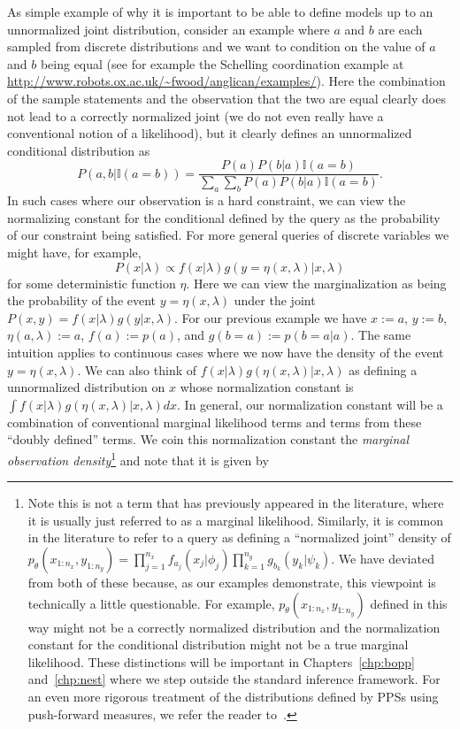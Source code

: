 As simple example of why it is important to be able to define models up to an unnormalized joint
distribution, consider an example where $a$ and $b$ are each sampled from discrete distributions
and we want to condition on the value of $a$ and $b$ being equal (see for example the Schelling
coordination example at {\small \url{http://www.robots.ox.ac.uk/~fwood/anglican/examples/}}).  Here
the combination of the sample statements and the observation that the two are equal clearly
does not lead to a correctly normalized joint (we do not even really have a conventional notion
of a likelihood), but it clearly defines an unnormalized conditional distribution as
\[
P(a,b | \mathbb{I}(a=b)) = \frac{P(a)P(b|a)\mathbb{I}(a=b)}{\sum_a \sum_b P(a)P(b|a) \mathbb{I}(a=b)}.
\]
In such cases where our observation is a hard constraint, we can view the normalizing constant for
the conditional defined by the query as the probability of our constraint being satisfied.  
For more general queries of discrete variables we might have, for example,
\[
P(x|\lambda) \propto f(x|\lambda)g(y=\eta(x,\lambda)|x,\lambda)
\]
for some deterministic function $\eta$.  Here we
can view the marginalization as being the probability of the event $y=\eta(x,\lambda)$ under the joint $P(x,y)=f(x|\lambda)g(y|x,\lambda)$.
For our previous example we have $x:=a$, $y:=b$, $\eta(a,\lambda):=a$, $f(a):=p(a)$, and $g(b=a):=p(b=a|a)$.
The same intuition applies to continuous cases where we now have the density of the event $y=\eta(x,\lambda)$.
We can also think of $f(x|\lambda)g(\eta(x,\lambda)|x,\lambda)$ as defining a unnormalized distribution on $x$ whose
normalization constant is $\int f(x|\lambda)g(\eta(x,\lambda)|x,\lambda) dx$.  In general, our normalization
constant will be a combination of conventional marginal likelihood terms and terms from these ``doubly defined''
terms. We coin this normalization constant the \emph{marginal observation density}\footnote{Note this is not a
	term that has previously appeared in the literature, where it is usually just referred to as a marginal
	likelihood.  Similarly, it is common in the literature to refer to a query as defining a ``normalized 
	joint'' density of $p_{\theta}(x_{1:n_x},y_{1:n_y}) = \prod_{j=1}^{n_x} f_{a_j}(x_j | \phi_j)
	\prod_{k=1}^{n_y} g_{b_k}(y_k | \psi_k)$.  We have deviated from both of these because, as our examples
	demonstrate, this viewpoint is technically a little questionable.  For example, $p_{\theta}(x_{1:n_x},y_{1:n_y})$
	defined in this way might not be a correctly normalized distribution and the normalization constant
	for the conditional distribution might not be a true marginal likelihood.  These distinctions will be
	important in Chapters~\ref{chp:bopp} and~\ref{chp:nest} where we step outside the standard inference
	framework.  For an even more rigorous treatment of the distributions defined by PPSs using push-forward
	measures, we refer the reader to~\cite{staton2016semantics}. 
	} and note that it is given by
